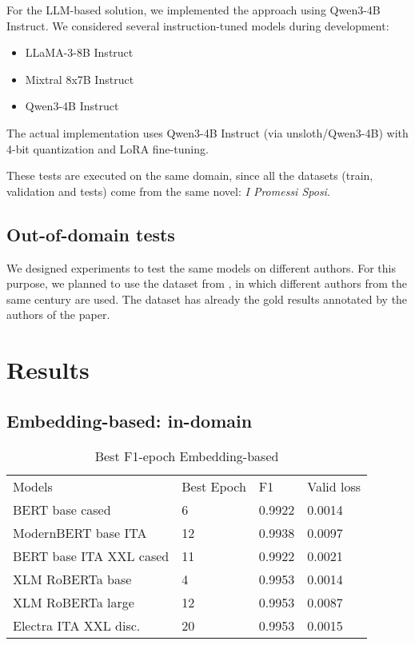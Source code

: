 \documentclass[11pt]{article}
\begin{document}
For the LLM-based solution, we implemented the approach using Qwen3-4B Instruct.
We considered several instruction-tuned models during development:

 \begin{itemize}
	\item LLaMA-3-8B Instruct
	\item Mixtral 8x7B Instruct
	\item Qwen3-4B Instruct
\end{itemize}

The actual implementation uses Qwen3-4B Instruct (via unsloth/Qwen3-4B) with 4-bit quantization and LoRA fine-tuning.

These tests are executed on the same domain, since all the datasets (train, validation and tests) 
come from the same novel: \emph{I Promessi Sposi}. 

\subsection{Out-of-domain tests}

We designed experiments to test the same models on different authors.
For this purpose, we planned to use the dataset from \cite{redaelli-sprugnoli-2024-sentence}, in which different authors
from the same century are used.
The dataset has already the gold results annotated by the authors of the paper.

\section{Results}

\subsection{Embedding-based: in-domain}

\begin{table}[]
	\small
	\caption{Best F1-epoch Embedding-based}
	\begin{tabular}{llll}
		Models & Best Epoch & F1 & Valid loss \\
		BERT base cased & 6      & 0.9922        & 0.0014                  \\
		ModernBERT base ITA  & 12      & 0.9938        & 0.0097                  \\
		BERT base ITA XXL cased & 11      & 0.9922        & 0.0021                 \\
		XLM RoBERTa base & 4       & 0.9953        & 0.0014                  \\
		XLM RoBERTa large & 12       & 0.9953       & 0.0087                 \\
		Electra ITA XXL disc. & 20       & 0.9953        & 0.0015                
	\end{tabular}
	\label{t1}
\end{table}
\end{document}
